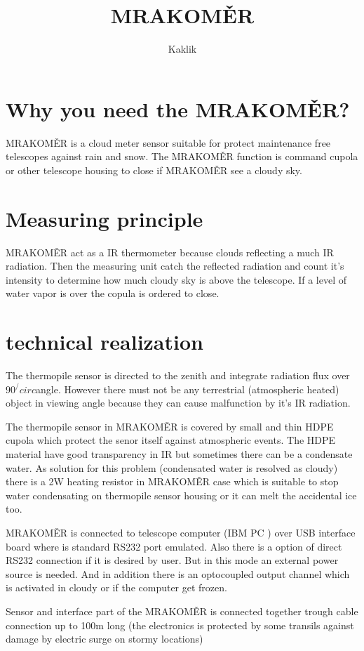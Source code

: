 \documentclass[10pt,a4paper,twoside]{article}
\author{Kaklik}
\title{MRAKOMĚR}
\begin{document}
\section{Why you need the MRAKOMĚR?}
MRAKOMĚR is a cloud meter sensor suitable for protect maintenance free telescopes against rain and snow. The MRAKOMĚR function is command cupola or other telescope housing to close if MRAKOMĚR see a cloudy sky. 

\section{Measuring principle}
MRAKOMĚR act as a IR thermometer because clouds reflecting a much IR radiation. Then the measuring unit catch the reflected radiation and count it's intensity to determine how much cloudy sky is above the telescope. If a level of water vapor is over the copula is ordered to close. 

\section{technical realization}
The thermopile sensor is directed  to the zenith and integrate radiation flux over $90^/circ$angle. However there must not be any terrestrial (atmospheric  heated) object in viewing  angle because they can cause malfunction by it's IR radiation.        

The thermopile sensor in MRAKOMĚR  is covered by small and thin HDPE cupola which protect the senor itself against atmospheric events. The HDPE material have good transparency in IR but sometimes there can be a condensate water. As solution for this problem (condensated water is resolved as cloudy) there is a 2W heating resistor in MRAKOMĚR case which is suitable to stop water condensating on thermopile sensor housing or it can melt the accidental ice too. 

MRAKOMĚR is connected to telescope computer (IBM PC ) over USB interface  board where is standard RS232 port emulated. Also there is a option of direct RS232 connection if it is desired by user. But in this mode an external power source is needed. And in addition there is an optocoupled output channel which is activated in cloudy or if the computer get frozen.

Sensor and interface part of the MRAKOMĚR is connected together trough  cable connection up to 100m long (the electronics is protected by some transils against damage by electric surge on stormy locations)
\end{document}
